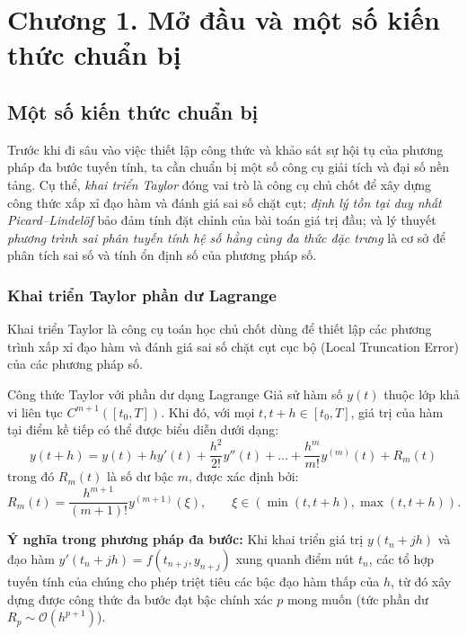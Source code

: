 \section{Chương 1. Mở đầu và một số kiến thức chuẩn bị}

\subsection{Một số kiến thức chuẩn bị}
    Trước khi đi sâu vào việc thiết lập công thức và khảo sát sự hội tụ của phương pháp đa bước tuyến tính, ta cần chuẩn bị một số công cụ giải tích và đại số nền tảng. Cụ thể, \textit{khai triển Taylor} đóng vai trò là công cụ chủ chốt để xây dựng công thức xấp xỉ đạo hàm và đánh giá sai số chặt cụt; \textit{định lý tồn tại duy nhất Picard–Lindelöf} bảo đảm tính đặt chỉnh của bài toán giá trị đầu; và lý thuyết \textit{phương trình sai phân tuyến tính hệ số hằng cùng đa thức đặc trưng} là cơ sở để phân tích sai số và tính ổn định số của phương pháp số.
    
\subsubsection{Khai triển Taylor phần dư Lagrange}
Khai triển Taylor là công cụ toán học chủ chốt dùng để thiết lập các phương trình xấp xỉ đạo hàm và đánh giá sai số chặt cụt cục bộ (Local Truncation Error) của các phương pháp số.
\begin{baitapbox}{Công thức Taylor với phần dư dạng Lagrange}
    Giả sử hàm số $y(t)$ thuộc lớp khả vi liên tục $C^{m+1}([t_0, T])$. Khi đó, với mọi $t, t + h \in [t_0, T]$, giá trị của hàm tại điểm kề tiếp có thể được biểu diễn dưới dạng:
    \begin{equation}
        y(t + h) = y(t) + h y'(t) + \frac{h^2}{2!} y''(t) + \dots + \frac{h^m}{m!} y^{(m)}(t) + R_m(t) \tag{1.1} \label{eq:1.1}
    \end{equation}
    \noindent trong đó $R_m(t)$ là số dư bậc $m$, được xác định bởi:
    \[
        R_m(t) = \frac{h^{m+1}}{(m+1)!} y^{(m+1)}(\xi), \qquad \xi \in (\min(t, t+h), \max(t, t+h)).
    \]

\end{baitapbox}
\textbf{Ý nghĩa trong phương pháp đa bước:} Khi khai triển giá trị $y(t_n + jh)$ và đạo hàm $y'(t_n + jh) = f(t_{n+j}, y_{n+j})$ xung quanh điểm nút $t_n$, các tổ hợp tuyến tính của chúng cho phép triệt tiêu các bậc đạo hàm thấp của $h$, từ đó xây dựng được công thức đa bước đạt bậc chính xác $p$ mong muốn (tức phần dư $R_p \sim \mathcal{O}(h^{p+1})$).\\



